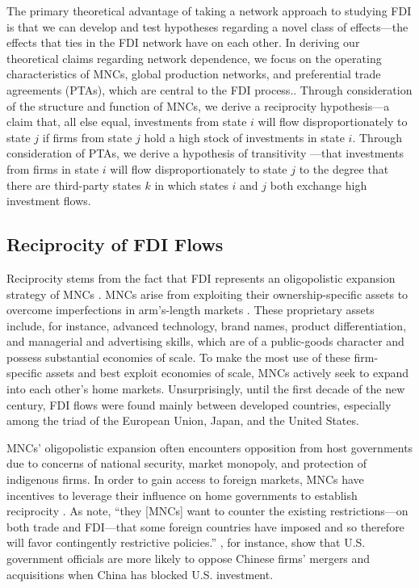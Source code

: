 \documentclass{article}
\begin{document}
The primary theoretical advantage of taking a network approach to studying FDI is that we can develop and test hypotheses regarding a novel class of effects---the effects that ties in the FDI network have on each other. In deriving our theoretical claims regarding network dependence, we focus on the operating characteristics of MNCs, global production networks, and preferential trade agreements (PTAs), which are central to the FDI process.. Through consideration of the structure and function of MNCs, we derive a reciprocity \citep{garlaschelli2004patterns} hypothesis---a claim that, all else equal, investments from state $i$ will flow disproportionately to state $j$ if firms from state $j$ hold a high stock of investments in state $i$. Through consideration of PTAs, we derive a hypothesis of transitivity \citep{holland1971transitivity}---that investments from firms in state $i$ will flow disproportionately to state $j$ to the degree that there are third-party states $k$ in which states $i$ and $j$ both exchange high investment flows.

\subsection{Reciprocity of FDI Flows}
Reciprocity stems from the fact that FDI represents an oligopolistic expansion strategy of MNCs \citep{Hymer:1976,Kindleberger:1969}. MNCs arise from exploiting their ownership-specific assets to overcome imperfections in arm's-length markets \citep{Caves:1996,Dunning:1992}. These proprietary assets include, for instance, advanced technology, brand names, product differentiation, and managerial and advertising skills, which are of a public-goods character and possess substantial economies of scale. To make the most use of these firm-specific assets and best exploit economies of scale, MNCs actively seek to expand into each other's home markets. Unsurprisingly, until the first decade of the new century, FDI flows were found mainly between developed countries, especially among the triad of the European Union, Japan, and the United States.

MNCs' oligopolistic expansion often encounters opposition from host governments due to concerns of national security, market monopoly, and protection of indigenous firms. In order to gain access to foreign markets, MNCs have incentives to leverage their influence on home governments to establish reciprocity \citep{Milner:1988,Crystal:2003}. As \citet[6]{Crystal:2003} note, ``they [MNCs] want to counter the existing restrictions---on both trade and FDI---that some foreign countries have imposed and so therefore will favor contingently restrictive policies.'' \citet{Tingley:2015}, for instance, show that U.S. government officials are more likely to oppose Chinese firms' mergers and acquisitions when China has blocked U.S. investment.
\end{document}
